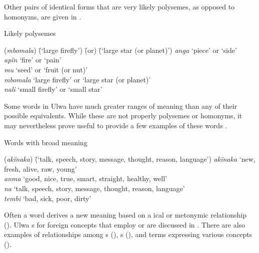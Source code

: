 Other pairs of identical forms that are very likely polysemes, as opposed to homonyms, are given in .

\ea%
    \label{ex:sem:4}
            Likely polysemes
\begin{tabbing}
{(\textit{mbomala})} \= {(‘large firefly’)} \= {(or)} \= {(‘large star (or planet)’)}\kill
{\textit{anga}} \> {‘piece’} \> {or} \> {‘side’}\\
{\textit{apïn}} \> {‘fire’} \> {or} \> {‘pain’}\\
{\textit{mu}} \> {‘seed’} \> {or} \> {‘fruit (or nut)’\footnotemark{}}\\
{\textit{mbomala}} \> {‘large firefly’} \> {or} \> {‘large star (or planet)’}\\
{\textit{nali}} \> {‘small firefly’} \> {or} \> {‘small star’\footnotemark{}}
\end{tabbing}
\z
{}

Some words in Ulwa have much greater ranges of meaning than any of their possible  equivalents. While these are not properly polysemes or homonyms, it may nevertheless prove useful to provide a few examples of these words .

\ea%
    \label{ex:sem:5}
            Words with broad meaning
\begin{tabbing}
{(\textit{akïnaka})} \= {(‘talk, speech, story, message, thought, reason, language’)}\kill
{\textit{akïnaka}} \> {‘new, fresh, alive, raw, young’}\\
{\textit{anma}} \> {‘good, nice, true, smart, straight, healthy, well’}\\
{\textit{na}} \> {‘talk, speech, story, message, thought, reason, language’}\\
{\textit{tembi}} \> {‘bad, sick, poor, dirty’}
\end{tabbing}
\z

Often a word derives a new meaning based on a ical or  metonymic relationship (). Ulwa s for foreign concepts that employ  or  are discussed in . There are also examples of  relationships among s (), s (), and terms expressing various  concepts ().

